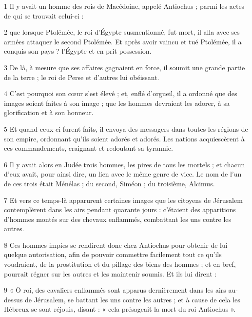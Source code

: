 \par 1 Il y avait un homme des rois de Macédoine, appelé Antiochus ; parmi les actes de qui se trouvait celui-ci :

\par 2 que lorsque Ptolémée, le roi d'Égypte susmentionné, fut mort, il alla avec ses armées attaquer le second Ptolémée. Et après avoir vaincu et tué Ptolémée, il a conquis son pays ? l'Égypte et en prit possession.

\par 3 De là, à mesure que ses affaires gagnaient en force, il soumit une grande partie de la terre ; le roi de Perse et d'autres lui obéissant.

\par 4 C'est pourquoi son cœur s'est élevé ; et, enflé d'orgueil, il a ordonné que des images soient faites à son image ; que les hommes devraient les adorer, à sa glorification et à son honneur.

\par 5 Et quand ceux-ci furent faits, il envoya des messagers dans toutes les régions de son empire, ordonnant qu'ils soient adorés et adorés. Les nations acquiescèrent à ces commandements, craignant et redoutant sa tyrannie.

\par 6 Il y avait alors en Judée trois hommes, les pires de tous les mortels ; et chacun d’eux avait, pour ainsi dire, un lien avec le même genre de vice. Le nom de l’un de ces trois était Ménélas ; du second, Siméon ; du troisième, Alcimus.

\par 7 Et vers ce temps-là apparurent certaines images que les citoyens de Jérusalem contemplèrent dans les airs pendant quarante jours : c'étaient des apparitions d'hommes montés sur des chevaux enflammés, combattant les uns contre les autres.

\par 8 Ces hommes impies se rendirent donc chez Antiochus pour obtenir de lui quelque autorisation, afin de pouvoir commettre facilement tout ce qu'ils voudraient, de la prostitution et du pillage des biens des hommes ; et en bref, pourrait régner sur les autres et les maintenir soumis. Et ils lui dirent :

\par 9 « Ô roi, des cavaliers enflammés sont apparus dernièrement dans les airs au-dessus de Jérusalem, se battant les uns contre les autres ; et à cause de cela les Hébreux se sont réjouis, disant : « cela présageait la mort du roi Antiochus ».

